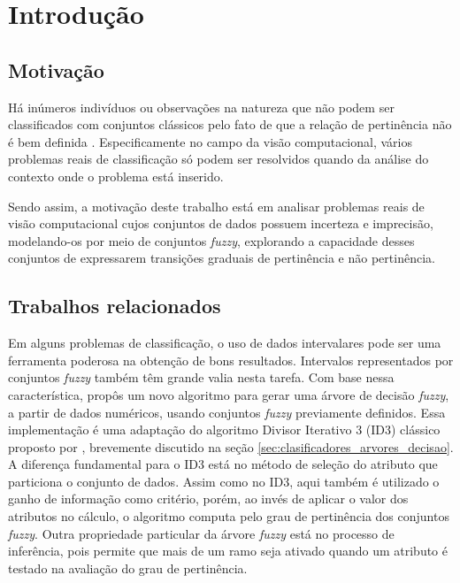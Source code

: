 \chapter{Introdução}
\label{cap:introducao}


\section{Motivação}
\label{sec:consideracoes_preliminares}

Há inúmeros indivíduos ou observações na natureza que não podem ser classificados com conjuntos clássicos pelo fato de que a relação de pertinência não é bem definida \citep{pedrycz:98}. Especificamente no campo da visão computacional, vários problemas reais de classificação só podem ser resolvidos quando da análise do contexto onde o problema está inserido.

Sendo assim, a motivação deste trabalho está em analisar problemas reais de visão computacional cujos conjuntos de dados possuem incerteza e imprecisão, modelando-os por meio de conjuntos \emph{fuzzy}, explorando a capacidade desses conjuntos de expressarem transições graduais de pertinência e não pertinência.


\section{Trabalhos relacionados}
\label{sec:trabalhos_relacionados}

Em alguns problemas de classificação, o uso de dados intervalares pode ser uma ferramenta poderosa na obtenção de bons resultados. Intervalos representados por conjuntos \emph{fuzzy} também têm grande valia nesta tarefa. Com base nessa característica, \citet{umano:94} propôs um novo algoritmo para gerar uma árvore de decisão \emph{fuzzy}, a partir de dados numéricos, usando conjuntos \emph{fuzzy} previamente definidos. Essa implementação é uma adaptação do algoritmo Divisor Iterativo 3 (ID3) clássico proposto por \citet{quinlan:86}, brevemente discutido na seção \ref{sec:clasificadores_arvores_decisao}. A diferença fundamental para o ID3 está no método de seleção do atributo que particiona o conjunto de dados. Assim como no ID3, aqui também é utilizado o ganho de informação como critério, porém, ao invés de aplicar o valor dos atributos no cálculo, o algoritmo computa pelo grau de pertinência dos conjuntos \emph{fuzzy}. Outra propriedade particular da árvore \emph{fuzzy} está no processo de inferência, pois permite que mais de um ramo seja ativado quando um atributo é testado na avaliação do grau de pertinência.

